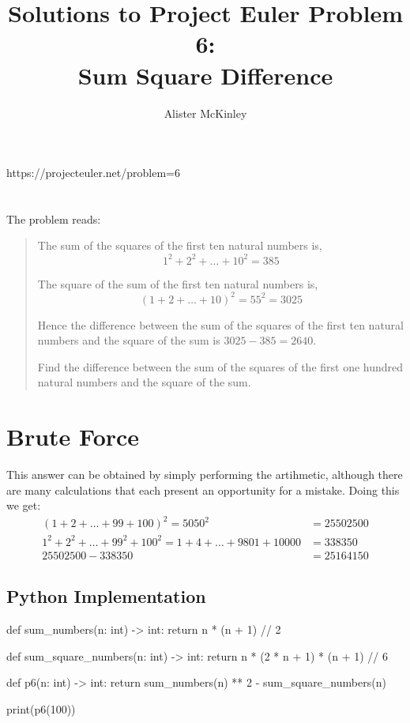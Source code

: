 \documentclass{article}
\title{Solutions to Project Euler Problem 6:\\Sum Square Difference}
\author{Alister McKinley}
\date{}
\begin{document}
\maketitle
\begin{center}
    https://projecteuler.net/problem=6
\end{center}

\section*{}
The problem reads:

\begin{quote}
    The sum of the squares of the first ten natural numbers is,
    \[1^2+2^2+\dots+10^2 = 385\]

    The square of the sum of the first ten natural numbers is,
    \[(1+2+\dots+10)^2 = 55^2 = 3025\]

    Hence the difference between the sum of the squares of the first ten natural numbers and the square of the sum is \(3025-385=2640\).

    Find the difference between the sum of the squares of the first one hundred natural numbers and the square of the sum.
\end{quote}

\section*{Brute Force}
This answer can be obtained by simply performing the artihmetic, although there are many calculations that each present an opportunity for a mistake. Doing this we get:
\[\begin{aligned}
    (1+2+\dots+99+100)^2 = 5050^2 &= 25502500 \\
    1^2 + 2^2 + \dots + 99^2 + 100^2 = 1 + 4 + \dots + 9801 + 10000 &= 338350 \\
    25502500 - 338350 &= 25164150
\end{aligned}\]

\pagebreak
\subsection*{Python Implementation}
\begin{pyverbatim}[][frame=single]
def sum_numbers(n: int) -> int:
    return n * (n + 1) // 2

def sum_square_numbers(n: int) -> int:
    return n * (2 * n + 1) * (n + 1) // 6

def p6(n: int) -> int:
    return sum_numbers(n) ** 2 - sum_square_numbers(n)

print(p6(100))
\end{pyverbatim}
\end{document}
